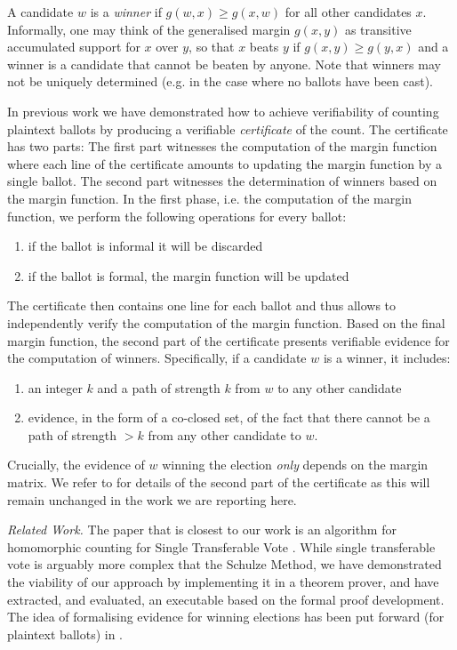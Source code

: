 \documentclass{llncs}
\begin{document}
  A candidate $w$ is a \emph{winner} if $g(w, x) \geq g(x, w)$ for
  all other candidates $x$. Informally, one may think of the
  generalised margin $g(x, y)$ as transitive accumulated support for
  $x$ over $y$, so that $x$ beats $y$ if $g(x,y) \geq g(y, x)$ and a
  winner is a candidate that cannot be beaten by anyone. Note that
  winners may not be uniquely determined (e.g. in the case where no
  ballots have been cast).

  In previous work \cite{Pattinson:2017:SVE} we have demonstrated
  how to achieve verifiability of counting plaintext ballots by
  producing a verifiable \emph{certificate} of the count. The
  certificate has two parts: The first part witnesses the
  computation of the margin function where each line of the
  certificate amounts to updating the margin function by a single
  ballot. The second part witnesses the determination of winners
  based on the margin function. In the first phase, i.e. the
  computation of the margin function, we perform the following
  operations for every ballot:
  \begin{enumerate}
    \item if the ballot is informal it will be discarded
    \item if the ballot is formal, the margin function will be
    updated
  \end{enumerate}
  The certificate then contains one line for each ballot and thus
  allows to independently verify the computation of the margin
  function. Based on the final margin function, the second part of
  the certificate presents verifiable evidence for the computation
  of winners. Specifically, if a candidate $w$ is a winner, it
  includes:
  \begin{enumerate}
    \item an integer $k$ and a path of strength $k$ from $w$ to any
    other candidate
    \item evidence, in the form of a co-closed set, of the fact that
    there cannot be a path of strength $> k$ from any other
    candidate to $w$.
  \end{enumerate}
  Crucially, the evidence of $w$ winning the election \emph{only}
  depends on the margin matrix. 
  We refer to \cite{Pattinson:2017:SVE} for details of the second
  part of the certificate as this will remain unchanged in the work
  we are reporting here.
    
\noindent\smallskip\emph{Related Work.} The paper that is closest to
our work is an algorithm for homomorphic counting for Single
Transferable Vote \cite{Benaloh:2009:SSC}. While single transferable
vote is arguably more complex that the Schulze Method, we have
demonstrated the viability of our approach by implementing it in a
theorem prover, and have extracted, and evaluated, an executable
based on the formal proof development. The idea of formalising
evidence for winning elections has been put forward (for plaintext
ballots) in \cite{Pattinson:2015:VCM}. 
\end{document}
